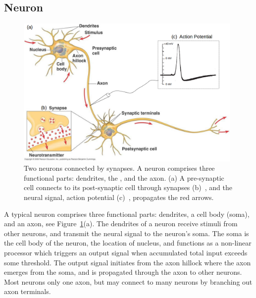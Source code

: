 \subsection{Neuron}
	\begin{figure}[bt]
	\centering
	\includegraphics[width=0.98\textwidth]{pics_snn/neuron2.png}
	\caption{Two neurons connected by synapses. 
		A neuron comprises three functional parts: dendrites, the \DIFdelbeginFL {}\DIFdelendFL \DIFaddbeginFL {}\DIFaddendFL , and the axon. (a) A pre-synaptic cell connects to its post-synaptic cell through synapses \DIFdelbeginFL {}\DIFdelendFL (b)~\citep{reece2011campbell}, and the neural signal, \DIFaddbeginFL {}\DIFaddendFL action potential \DIFdelbeginFL {}\DIFdelendFL (c)~\citep{hodgkin1939action}, propagates \DIFdelbeginFL {}\DIFdelendFL \DIFaddbeginFL {}\DIFaddendFL the red arrows. }
	\label{Fig:neuron_basic}
\end{figure}

A typical neuron comprises \DIFdelbegin {}\DIFdelend three functional parts: dendrites, a cell body (soma), and an axon, see Figure~\ref{Fig:neuron_basic}(a).
The dendrites of a neuron receive stimuli from other neurons, and transmit the neural signal to the neuron's soma.
The soma is the cell body of the neuron, the location of \DIFaddbegin {}\DIFaddend nucleus, and functions as a non-linear processor which triggers an output signal when \DIFaddbegin {}\DIFaddend accumulated total input exceeds some threshold.
The output signal initiates from the axon hillock where the axon emerges from the soma, and is propagated through the axon to other neurons.
Most neurons \DIFdelbegin {}\DIFdelend \DIFaddbegin {}\DIFaddend only one axon, but may connect to many neurons by branching out axon terminals. 


